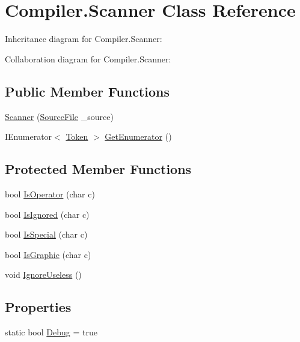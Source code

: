 \hypertarget{class_compiler_1_1_scanner}{}\section{Compiler.\+Scanner Class Reference}
\label{class_compiler_1_1_scanner}


Inheritance diagram for Compiler.\+Scanner\+:


Collaboration diagram for Compiler.\+Scanner\+:
\subsection*{Public Member Functions}
\begin{DoxyCompactItemize}
\item 
\mbox{\hyperlink{class_compiler_1_1_scanner_a1b80cbd150fb8fdb87f6b31c9d2ddc48}{Scanner}} (\mbox{\hyperlink{class_compiler_1_1_source_file}{Source\+File}} \+\_\+source)
\item 
I\+Enumerator$<$ \mbox{\hyperlink{class_compiler_1_1_token}{Token}} $>$ \mbox{\hyperlink{class_compiler_1_1_scanner_aea1e54cd0fb8a4b19f9403be60720ff9}{Get\+Enumerator}} ()
\end{DoxyCompactItemize}
\subsection*{Protected Member Functions}
\begin{DoxyCompactItemize}
\item 
bool \mbox{\hyperlink{class_compiler_1_1_scanner_afbd70f210f32a803266e042bfe13e58b}{Is\+Operator}} (char c)
\item 
bool \mbox{\hyperlink{class_compiler_1_1_scanner_adb2fc8cf5a107c41d73e00eb93a98ca2}{Is\+Ignored}} (char c)
\item 
bool \mbox{\hyperlink{class_compiler_1_1_scanner_a60cdf39c3f0fb8d97ca4b635ca2eb0c2}{Is\+Special}} (char c)
\item 
bool \mbox{\hyperlink{class_compiler_1_1_scanner_a6b4be2a8e2aa19e24ecb1abc692dcebc}{Is\+Graphic}} (char c)
\item 
void \mbox{\hyperlink{class_compiler_1_1_scanner_abd981910f7c2f50c9ed8e778d93fffdd}{Ignore\+Useless}} ()
\end{DoxyCompactItemize}
\subsection*{Properties}
\begin{DoxyCompactItemize}
\item 
static bool \mbox{\hyperlink{class_compiler_1_1_scanner_aebce05a12eba0f6267dfa8dd2fa07b1f}{Debug}} = true
\end{DoxyCompactItemize}
